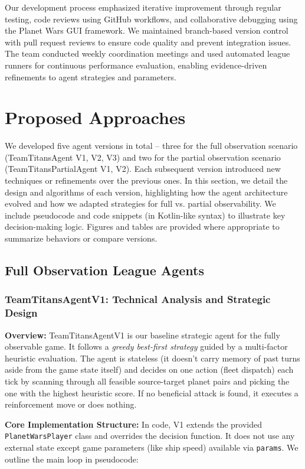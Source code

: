 \documentclass[conference]{IEEEtran}
\begin{document}
Our development process emphasized iterative improvement through regular testing, code reviews using GitHub workflows, and collaborative debugging using the Planet Wars GUI framework. We maintained branch-based version control with pull request reviews to ensure code quality and prevent integration issues. The team conducted weekly coordination meetings and used automated league runners for continuous performance evaluation, enabling evidence-driven refinements to agent strategies and parameters.

\section{Proposed Approaches}

We developed five agent versions in total -- three for the full observation scenario (TeamTitansAgent V1, V2, V3) and two for the partial observation scenario (TeamTitansPartialAgent V1, V2). Each subsequent version introduced new techniques or refinements over the previous ones. In this section, we detail the design and algorithms of each version, highlighting how the agent architecture evolved and how we adapted strategies for full vs. partial observability. We include pseudocode and code snippets (in Kotlin-like syntax) to illustrate key decision-making logic. Figures and tables are provided where appropriate to summarize behaviors or compare versions.
\subsection{Full Observation League Agents}

\subsubsection{TeamTitansAgentV1: Technical Analysis and Strategic Design}

\textbf{Overview:} TeamTitansAgentV1 is our baseline strategic agent for the fully observable game. It follows a \textit{greedy best-first strategy} guided by a multi-factor heuristic evaluation. The agent is stateless (it doesn't carry memory of past turns aside from the game state itself) and decides on one action (fleet dispatch) each tick by scanning through all feasible source-target planet pairs and picking the one with the highest heuristic score. If no beneficial attack is found, it executes a reinforcement move or does nothing.

\textbf{Core Implementation Structure:} In code, V1 extends the provided \texttt{PlanetWarsPlayer} class and overrides the decision function. It does not use any external state except game parameters (like ship speed) available via \texttt{params}. We outline the main loop in pseudocode:
\end{document}
